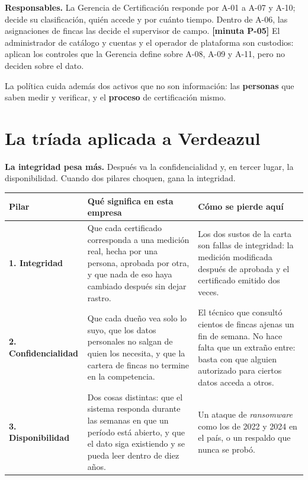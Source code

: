 \documentclass[11pt,letterpaper]{article}
\newcommand{\cab}[1]{\textbf{\rmfamily #1}}
\newcommand{\resp}[1]{\textrm{\footnotesize\bfseries [minuta #1]}}
\begin{document}
\textbf{Responsables.} La Gerencia de Certificación responde por A-01 a A-07 y A-10; decide su
clasificación, quién accede y por cuánto tiempo. Dentro de A-06, las asignaciones de fincas las decide
el supervisor de campo. \resp{P-05} El administrador de catálogo y cuentas y el operador de plataforma
son custodios: aplican los controles que la Gerencia define sobre A-08, A-09 y A-11, pero no deciden
sobre el dato.

La política cuida además dos activos que no son información: las \textbf{personas} que saben medir y
verificar, y el \textbf{proceso} de certificación mismo.

\section{La tríada aplicada a Verdeazul}
\label{sec:triada}

\begin{decision}
\textbf{La integridad pesa más.} Después va la confidencialidad y, en tercer lugar, la disponibilidad.
Cuando dos pilares choquen, gana la integridad.
\end{decision}

\begin{center}
\small
\renewcommand{\arraystretch}{1.2}
\begin{tabularx}{\textwidth}{@{}L{3.0cm} Y Y@{}}
\toprule
\cab{Pilar} & \cab{Qué significa en esta empresa} & \cab{Cómo se pierde aquí} \\
\midrule
\textbf{1. Integridad} &
Que cada certificado corresponda a una medición real, hecha por una persona, aprobada por otra, y que
nada de eso haya cambiado después sin dejar rastro. &
Los dos sustos de la carta son fallas de integridad: la medición modificada después de aprobada y el
certificado emitido dos veces. \\
\textbf{2. Confidencialidad} &
Que cada dueño vea solo lo suyo, que los datos personales no salgan de quien los necesita, y que la
cartera de fincas no termine en la competencia. &
El técnico que consultó cientos de fincas ajenas un fin de semana. No hace falta que un extraño entre:
basta con que alguien autorizado para ciertos datos acceda a otros. \\
\textbf{3. Disponibilidad} &
Dos cosas distintas: que el sistema responda durante las semanas en que un período está abierto, y que
el dato siga existiendo y se pueda leer dentro de diez años. &
Un ataque de \emph{ransomware} como los de 2022 y 2024 en el país, o un respaldo que nunca se probó. \\
\bottomrule
\end{tabularx}
\end{center}
\end{document}

